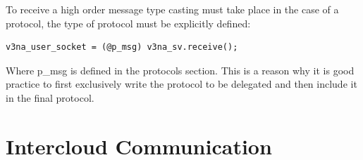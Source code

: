 \documentclass{llncs}
\begin{document}
To receive a high order message type casting must take place in the case of a protocol, the type of protocol must be explicitly defined:

\begin{lstlisting}
v3na_user_socket = (@p_msg) v3na_sv.receive();
\end{lstlisting}

Where p\_msg is defined in the protocols section. This is a reason why it is good practice to first exclusively write the protocol to be delegated and then include it in the final protocol.



\section{Intercloud Communication}
\label{sect:highlights}



%
\label{sect:bib}

%
%
%


\appendix




\end{document}
